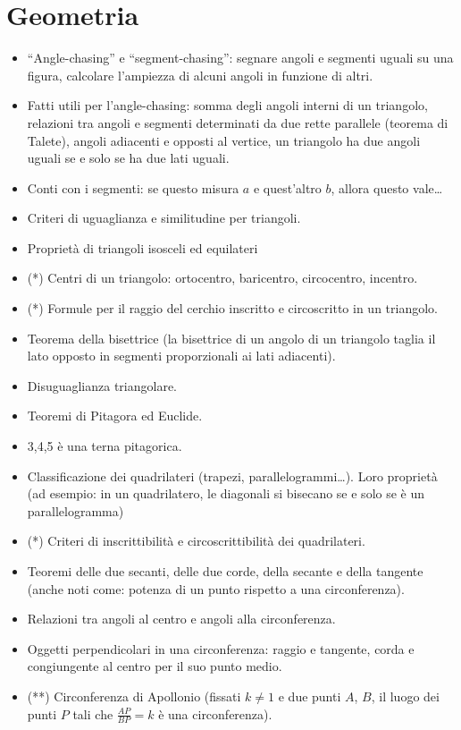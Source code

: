 \documentclass[a4paper,10pt]{paper}
\renewcommand{\star}{(*)}
\newcommand{\sstar}{(**)}
\begin{document}
\section{Geometria}
\begin{itemize}
 \item ``Angle-chasing'' e ``segment-chasing'': segnare angoli e segmenti uguali su una figura, calcolare l'ampiezza di alcuni angoli in funzione di altri.
 \item Fatti utili per l'angle-chasing: somma degli angoli interni di un triangolo, relazioni tra angoli e segmenti determinati da due rette parallele (teorema di Talete), angoli adiacenti e opposti al vertice, un triangolo ha due angoli uguali se e solo se ha due lati uguali.
 \item Conti con i segmenti: se questo misura $a$ e quest'altro $b$, allora questo vale\dots
 \item Criteri di uguaglianza e similitudine per triangoli.
 \item Proprietà di triangoli isosceli ed equilateri
 \item \star{} Centri di un triangolo: ortocentro, baricentro, circocentro, incentro.
 \item \star{} Formule per il raggio del cerchio inscritto e circoscritto in un triangolo.
 \item Teorema della bisettrice (la bisettrice di un angolo di un triangolo taglia il lato opposto in segmenti proporzionali ai lati adiacenti).
 \item Disuguaglianza triangolare.
 \item Teoremi di Pitagora ed Euclide.
 \item 3,4,5 è una terna pitagorica.
 \item Classificazione dei quadrilateri (trapezi, parallelogrammi\dots). Loro proprietà (ad esempio: in un quadrilatero, le diagonali si bisecano se e solo se è un parallelogramma)
 \item \star{} Criteri di inscrittibilità e circoscrittibilità dei quadrilateri.
 \item Teoremi delle due secanti, delle due corde, della secante e della tangente (anche noti come: potenza di un punto rispetto a una circonferenza).
 \item Relazioni tra angoli al centro e angoli alla circonferenza.
 \item Oggetti perpendicolari in una circonferenza: raggio e tangente, corda e congiungente al centro per il suo punto medio.
 \item \sstar{} Circonferenza di Apollonio (fissati $k\neq 1$ e due punti $A$, $B$, il luogo dei punti $P$ tali che $\frac{AP}{BP}=k$ è una circonferenza).

\end{itemize}
\end{document}
